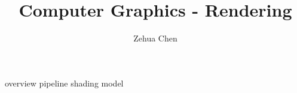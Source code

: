 \documentclass[letterpaper, 11pt]{report}
\title{Computer Graphics - Rendering}
\author{Zehua Chen}
\begin{document}
  \maketitle
  \tableofcontents

  {overview}
  {pipeline}
  {shading}
  {model}
\end{document}
